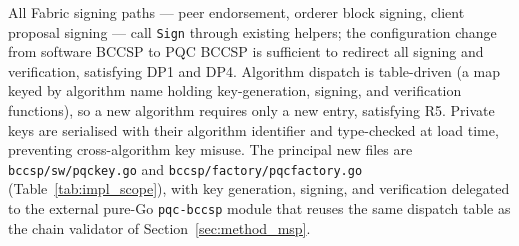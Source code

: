 \documentclass{ieeetj}
\begin{document}
All Fabric signing paths --- peer endorsement, orderer block signing, client
proposal signing --- call \texttt{Sign} through existing helpers; the
configuration change from software BCCSP to PQC BCCSP is sufficient to redirect
all signing and verification, satisfying DP1 and DP4. Algorithm dispatch is
table-driven (a map keyed by algorithm name holding key-generation, signing, and
verification functions), so a new algorithm requires only a new entry,
satisfying R5. Private keys are serialised with their algorithm identifier and
type-checked at load time, preventing cross-algorithm key misuse. The principal
new files are \texttt{bccsp/sw/pqckey.go} and
\texttt{bccsp/factory/pqcfactory.go} (Table~\ref{tab:impl_scope}), with key
generation, signing, and verification delegated to the external pure-Go
\texttt{pqc-bccsp} module that reuses the same dispatch table as the chain
validator of Section~\ref{sec:method_msp}.
\end{document}
